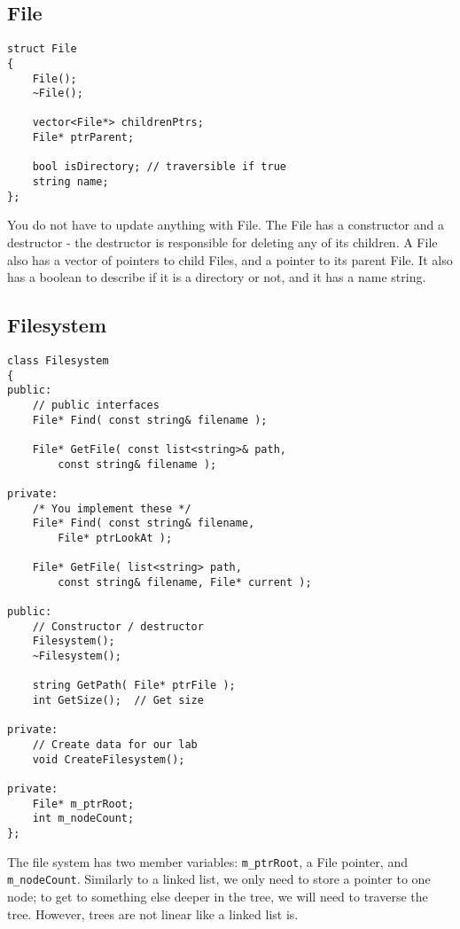 \documentclass[a4paper,12pt,oneside]{book}
\begin{document}
\subsection{File}

\begin{lstlisting}[style=code]
struct File
{
	File();
	~File();

	vector<File*> childrenPtrs;
	File* ptrParent;

	bool isDirectory; // traversible if true
	string name;
};
\end{lstlisting}

You do not have to update anything with File. The File has a constructor
and a destructor - the destructor is responsible for deleting any of its children.
A File also has a vector of pointers to child Files, and a pointer to its
parent File.
It also has a boolean to describe if it is a directory or not, and it has
a name string.

\newpage

\subsection{Filesystem}

\begin{lstlisting}[style=code]
class Filesystem
{
public:
    // public interfaces
    File* Find( const string& filename );
    
    File* GetFile( const list<string>& path,
        const string& filename );

private:
    /* You implement these */
    File* Find( const string& filename,
        File* ptrLookAt );
        
    File* GetFile( list<string> path,
        const string& filename, File* current );

public:
    // Constructor / destructor
	Filesystem();
	~Filesystem();
    
	string GetPath( File* ptrFile );
	int GetSize();  // Get size

private:
    // Create data for our lab
	void CreateFilesystem();

private:
	File* m_ptrRoot;
	int m_nodeCount;
};
\end{lstlisting}

The file system has two member variables: \texttt{m\_ptrRoot}, a File pointer,
and \texttt{m\_nodeCount}. Similarly to a linked list, we only need to store
a pointer to one node; to get to something else deeper in the tree,
we will need to traverse the tree. However, trees are not linear like a linked list is.
\end{document}

